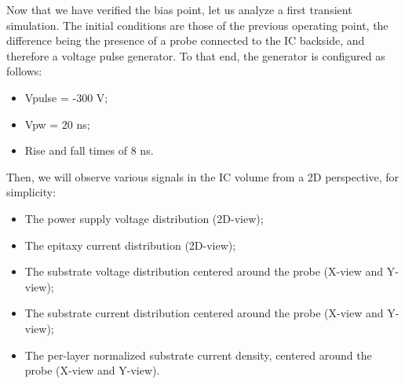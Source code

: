 		Now that we have verified the bias point, let us analyze a first transient simulation.
		The initial conditions are those of the previous operating point, the difference being the presence of a probe connected to the IC backside, and therefore a voltage pulse generator.
		To that end, the generator is configured as follows:
		\begin{itemize}
			\item Vpulse = -300 V;
			\item Vpw = 20 ns;
			\item Rise and fall times of 8 ns.
		\end{itemize}
		Then, we will observe various signals in the IC volume from a 2D perspective, for simplicity:
		\begin{itemize}
			\item The power supply voltage distribution (2D-view);
			\item The epitaxy current distribution (2D-view);
			\item The substrate voltage distribution centered around the probe (X-view and Y-view);
			\item The substrate current distribution centered around the probe (X-view and Y-view);
			\item The per-layer normalized substrate current density, centered around the probe (X-view and Y-view).
		\end{itemize}
		
